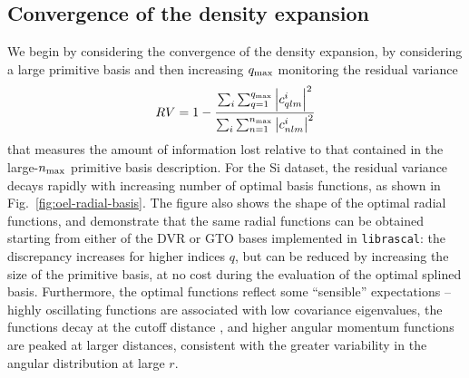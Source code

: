 \subsection{Convergence of the density expansion}

We begin by considering the convergence of the density expansion, by considering a large primitive basis and then increasing $q_\mathrm{max}$ monitoring the residual variance
\begin{equation}
  RV = 1-\frac{\sum_i\sum_{q=1}^{q_\mathrm{max}} \left|c^i_{qlm} \right|^2}{\sum_i\sum_{n=1}^{n_\mathrm{max}} \left|c^i_{nlm}\right|^2}
\end{equation}
that measures the amount of information lost relative to that contained in the large-$n_\mathrm{max}$ primitive basis description. 
For the Si dataset, the residual variance decays rapidly with increasing number of optimal basis functions, as shown in Fig.~\ref{fig:oel-radial-basis}.
The figure also shows the shape of the optimal radial functions, and demonstrate that the same radial functions can be obtained starting from either of the DVR or GTO bases implemented in \texttt{librascal}: the discrepancy increases for higher indices $q$, but can be reduced by increasing the size of the primitive basis, at no cost during the evaluation of the optimal splined basis. Furthermore, the optimal functions reflect some ``sensible'' expectations -- highly oscillating functions are associated with low covariance eigenvalues, the functions decay at the cutoff distance 
, and higher angular momentum functions are peaked at larger distances, consistent with the greater variability in the angular distribution at large $r$.




